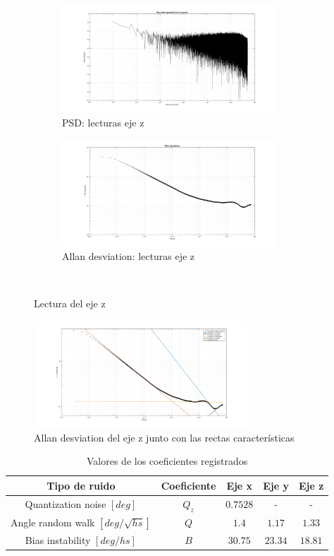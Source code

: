 \documentclass[a4paper,11pt,twoside]{IT-CNEA}
\begin{document}
\begin{figure}[t!]
    \centering
    \begin{subfigure}[t]{0.5\textwidth}
        \centering
        \includegraphics[width=8cm]{Figuras/PSDGyroz.png}
        \caption{PSD: lecturas eje z}
        \label{fig:}
    \end{subfigure}%
    \begin{subfigure}[t]{0.5\textwidth}
        \centering
        \includegraphics[width=8cm]{Figuras/AllanGyroz.png}
        \caption{Allan desviation: lecturas eje z}
        \label{fig:}
    \end{subfigure}%
    ~ 
    \caption{Lectura del eje z}
    \label{fig:lecturasEjez}
\end{figure}
\begin{figure}[h!]
\centering
\includegraphics[width=8cm]{Figuras/AllanGyrozRectas.png}
\caption{Allan desviation del eje z junto con las rectas características}
\label{fig:lecturaEjezRectas}
\end{figure}
\begin{table}[h!]
\centering
\caption{Valores de los coeficientes registrados}
\label{tabla:valoresCoeficientesEjes}
\begin{tabular}{|c|c|c|c|c|}
\hline
Tipo de ruido&Coeficiente& Eje x & Eje y & Eje z \\ \hline
Quantization noise $\left[ deg\right]$&$Q_z$&$0.7528$&-&-\\ \hline
Angle random walk $\left[ deg/\sqrt{hs}\right]$&$Q$&$1.4$&$1.17$&$1.33$\\ \hline
Bias instability $\left[ deg/hs \right]$&$B$&$30.75$ &$23.34$ &$18.81$\\ \hline
\end{tabular}
\end{table}
\end{document}
